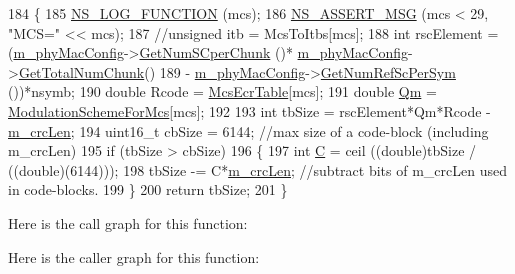 \begin{DoxyCode}
184 \{
185         \hyperlink{log-macros-disabled_8h_a90b90d5bad1f39cb1b64923ea94c0761}{NS\_LOG\_FUNCTION} (mcs);
186         \hyperlink{assert_8h_aff5ece9066c74e681e74999856f08539}{NS\_ASSERT\_MSG} (mcs < 29, \textcolor{stringliteral}{"MCS="} << mcs);
187         \textcolor{comment}{//unsigned itb = McsToItbs[mcs];}
188         \textcolor{keywordtype}{int} rscElement = (\hyperlink{classns3_1_1MmWaveAmc_ae2bd45429e23c9091597462d888e8d6f}{m\_phyMacConfig}->\hyperlink{classns3_1_1MmWavePhyMacCommon_a724771405a9e4d3e2ee251be4aff8abc}{GetNumSCperChunk} ()*
      \hyperlink{classns3_1_1MmWaveAmc_ae2bd45429e23c9091597462d888e8d6f}{m\_phyMacConfig}->\hyperlink{classns3_1_1MmWavePhyMacCommon_a97e82c809a351fea9d5058ac1bb4c3c6}{GetTotalNumChunk}()
189                         - \hyperlink{classns3_1_1MmWaveAmc_ae2bd45429e23c9091597462d888e8d6f}{m\_phyMacConfig}->\hyperlink{classns3_1_1MmWavePhyMacCommon_a4255231004e45cc9b3df0ceb791353db}{GetNumRefScPerSym} ())*nsymb;
190         \textcolor{keywordtype}{double} Rcode = \hyperlink{namespacens3_a5e80c75db664b51189d262e55aba06be}{McsEcrTable}[mcs];
191         \textcolor{keywordtype}{double} \hyperlink{loss__ITU1411__NLOS__over__rooftop_8m_a5bda9815415e83db7d9a9adf5ca84fd2}{Qm} = \hyperlink{namespacens3_ae77af3b468826ac14e69fe8175220f80}{ModulationSchemeForMcs}[mcs];
192 
193         \textcolor{keywordtype}{int} tbSize = rscElement*Qm*Rcode - \hyperlink{classns3_1_1MmWaveAmc_a11a852907226e549ff50ec3b7248f0ad}{m\_crcLen};
194         uint16\_t cbSize = 6144;  \textcolor{comment}{//max size of a code-block (including m\_crcLen)}
195         \textcolor{keywordflow}{if} (tbSize > cbSize)
196         \{
197                 \textcolor{keywordtype}{int} \hyperlink{generate__test__data__lte__sinr_8m_ae24bb667d5023e5aaa1e71c3a15e447e}{C} = ceil ((\textcolor{keywordtype}{double})tbSize / ((\textcolor{keywordtype}{double})(6144)));
198                 tbSize -= C*\hyperlink{classns3_1_1MmWaveAmc_a11a852907226e549ff50ec3b7248f0ad}{m\_crcLen}; \textcolor{comment}{//subtract bits of m\_crcLen used in code-blocks.}
199         \}
200         \textcolor{keywordflow}{return} tbSize;
201 \}
\end{DoxyCode}


Here is the call graph for this function\+:




Here is the caller graph for this function\+:


